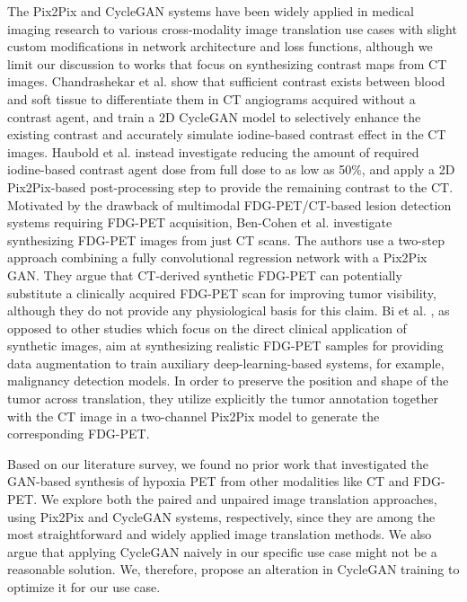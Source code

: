 The Pix2Pix and CycleGAN systems have been widely applied in medical imaging research to various cross-modality image translation use cases \cite{yi2019generative} with slight custom modifications in network architecture and loss functions, although we limit our discussion to works that focus on synthesizing contrast maps from CT images. Chandrashekar et al. \cite{chandrashekar2020deep} show that sufficient contrast exists between blood and soft tissue to differentiate them in CT angiograms acquired without a contrast agent, and train a 2D CycleGAN model to selectively enhance the existing contrast and accurately simulate iodine-based contrast effect in the CT images. Haubold et al. \cite{haubold2021contrast} instead investigate reducing the amount of required iodine-based contrast agent dose from full dose to as low as 50\%, and apply a 2D Pix2Pix-based post-processing step to provide the remaining contrast to the CT. Motivated by the drawback of multimodal FDG-PET/CT-based lesion detection systems requiring FDG-PET acquisition, Ben-Cohen et al. \cite{bencohen2018crossmodality} investigate synthesizing FDG-PET images from just CT scans. The authors use a two-step approach combining a fully convolutional regression network with a Pix2Pix GAN. They argue that CT-derived synthetic FDG-PET can potentially substitute a clinically acquired FDG-PET scan for improving tumor visibility, although they do not provide any physiological basis for this claim. Bi et al. \cite{bi2017synthesis}, as opposed to other studies which focus on the direct clinical application of synthetic images, aim at synthesizing realistic FDG-PET samples for providing data augmentation to train auxiliary deep-learning-based systems, for example, malignancy detection models. In order to preserve the position and shape of the tumor across translation, they utilize explicitly the tumor annotation together with the CT image in a two-channel Pix2Pix model to generate the corresponding FDG-PET. 

Based on our literature survey, we found no prior work that investigated the GAN-based synthesis of hypoxia PET from other modalities like CT and FDG-PET. We explore both the paired and unpaired image translation approaches, using Pix2Pix and CycleGAN systems, respectively, since they are among the most straightforward and widely applied image translation methods. We also argue that applying CycleGAN naively in our specific use case might not be a reasonable solution. We, therefore, propose an alteration in CycleGAN training to optimize it for our use case.



